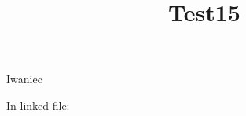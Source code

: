 \documentclass[reqno]{amsart} 
\title{Test15}
\begin{document}
Iwaniec \cite{Iwaniec1992}

In linked file: \cite{JN19a}

{} 
\end{document}
